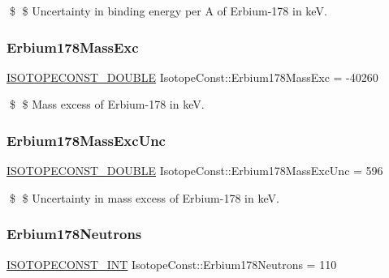 \$ \$ Uncertainty in binding energy per A of Erbium-\/178 in keV. \mbox{\label{group___isotope_const-_erbium-_er178_ga26884b439fc771ca997bdee6d91b808c}} 
\subsubsection{\texorpdfstring{Erbium178\+Mass\+Exc}{Erbium178MassExc}}
{\footnotesize\ttfamily \mbox{\hyperlink{group___isotope_const-_macros_ga8f45a7272ce02c0b4c65c44636ed719a}{I\+S\+O\+T\+O\+P\+E\+C\+O\+N\+S\+T\+\_\+\+D\+O\+U\+B\+LE}} Isotope\+Const\+::\+Erbium178\+Mass\+Exc = -\/40260}

\$ \$ Mass excess of Erbium-\/178 in keV. \mbox{\label{group___isotope_const-_erbium-_er178_ga8c034439a2972b9b35cb63d1f53e94d6}} 
\subsubsection{\texorpdfstring{Erbium178\+Mass\+Exc\+Unc}{Erbium178MassExcUnc}}
{\footnotesize\ttfamily \mbox{\hyperlink{group___isotope_const-_macros_ga8f45a7272ce02c0b4c65c44636ed719a}{I\+S\+O\+T\+O\+P\+E\+C\+O\+N\+S\+T\+\_\+\+D\+O\+U\+B\+LE}} Isotope\+Const\+::\+Erbium178\+Mass\+Exc\+Unc = 596}

\$ \$ Uncertainty in mass excess of Erbium-\/178 in keV. \mbox{\label{group___isotope_const-_erbium-_er178_ga629cb79a4c930379b31490f69fbc6469}} 
\subsubsection{\texorpdfstring{Erbium178\+Neutrons}{Erbium178Neutrons}}
{\footnotesize\ttfamily \mbox{\hyperlink{group___isotope_const-_macros_ga5f18360b3e99483a35c32d789e62621c}{I\+S\+O\+T\+O\+P\+E\+C\+O\+N\+S\+T\+\_\+\+I\+NT}} Isotope\+Const\+::\+Erbium178\+Neutrons = 110}

